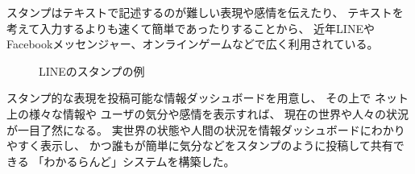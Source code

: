 スタンプはテキストで記述するのが難しい表現や感情を伝えたり、
テキストを考えて入力するよりも速くて簡単であったりすることから、
近年LINEやFacebookメッセンジャー、オンラインゲームなどで広く利用されている。

\begin{figure}[H]
\centering{}
\caption{LINEのスタンプの例}
\label{linestamp}
\end{figure}

スタンプ的な表現を投稿可能な情報ダッシュボードを用意し、
その上で
ネット上の様々な情報や
ユーザの気分や感情を表示すれば、
現在の世界や人々の状況が一目了然になる。
%
実世界の状態や人間の状況を情報ダッシュボードにわかりやすく表示し、
かつ誰もが簡単に気分などをスタンプのように投稿して共有できる
「わかるらんど」システムを構築した。



